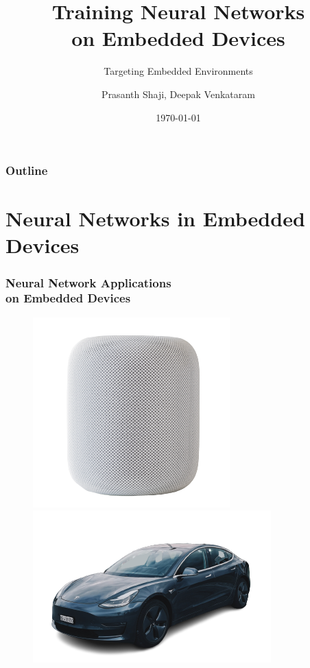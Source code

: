 \documentclass{beamer}
\title
{Training Neural Networks \\ on Embedded Devices}
\subtitle{Targeting Embedded Environments}
\author[Prasanth Shaji, Deepak Venkataram]
{Prasanth Shaji, Deepak Venkataram}
\institute[Dept. of Information Technology]
{
  Master's Thesis \\
  Uppsala University
}
\date[HDR-NN]
{\today}
\begin{document}
\begin{frame}[plain]
  \titlepage
\end{frame}

\begin{frame}
    \frametitle{Outline}
    \tableofcontents
\end{frame}

\section{Neural Networks in Embedded Devices}

\begin{frame}
  \frametitle{Neural Network Applications \\ on Embedded Devices}

  \begin{figure}
    \centering
    \includegraphics[scale=0.42]{images/smart-speaker}
    \includegraphics[scale=0.42]{images/tesla}
  \end{figure}

\end{frame}
\end{document}
